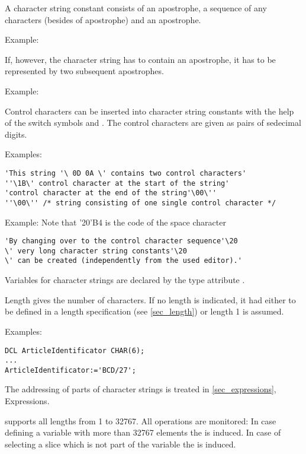 A character string constant consists of an apostrophe, a sequence of any
characters (besides of apostrophe) and an apostrophe.

Example: 

If, however, the character string has to contain an apostrophe, it has
to be represented by two subsequent apostrophes.

Example: 

Control characters can be inserted into character string constants with
the help of the switch symbols  and 
. 
 The control characters are given as pairs of sedecimal digits.

Examples:

\begin{lstlisting}
'This string '\ 0D 0A \' contains two control characters'
''\1B\' control character at the start of the string'
'control character at the end of the string'\00\''
''\00\'' /* string consisting of one single control character */
\end{lstlisting}

Example: Note that '20'B4 is the code of the space character

\begin{lstlisting}
'By changing over to the control character sequence'\20
\' very long character string constants'\20
\' can be created (independently from the used editor).'
\end{lstlisting}

Variables for character strings are declared by the type attribute
.

\begin{grammarframe}

\end{grammarframe}

Length gives the number of characters. If no length is indicated, it had
either to be defined in a length specification (see \ref{sec_length}) or length 1 is
assumed.

Examples:

\begin{lstlisting}
DCL ArticleIdentificator CHAR(6);
...
ArticleIdentificator:='BCD/27';
\end{lstlisting}

The addressing of parts of character strings is treated in
 \ref{sec_expressions}, Expressions.

\OpenPEARL{} supports all lengths from 1 to 32767.
All operations are monitored:
In case defining a  variable with more than 32767 elements the
 is induced.
In case of selecting a slice which is not part of the  variable the 
 is induced.

